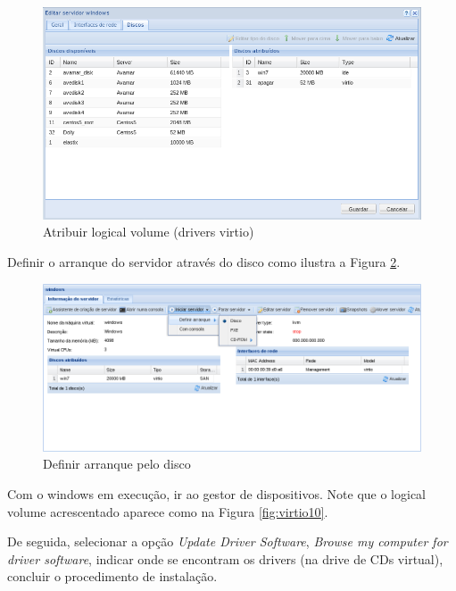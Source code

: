 \begin{figure}[H]
	\begin{center}
	\includegraphics[scale=0.5]{screenshots/virtio/virtio_7.png}
	\caption{Atribuir logical volume (drivers virtio)}
	\label{fig:virtio7}
	\end{center}
\end{figure}

Definir o arranque do servidor através do disco como ilustra a Figura \ref{fig:virtio5}.

\begin{figure}[H]
	\begin{center}
	\includegraphics[scale=0.5]{screenshots/virtio/virtio_5.png}
	\caption{Definir arranque pelo disco}
	\label{fig:virtio5}
	\end{center}
\end{figure}

Com o windows em execução, ir ao gestor de dispositivos. Note que o logical volume acrescentado aparece como na Figura \ref{fig:virtio10}. 

De seguida, selecionar a opção \textit{Update Driver Software}, \textit{Browse my computer for driver software}, indicar onde se encontram os drivers (na drive de CDs virtual), concluir o procedimento de instalação.

